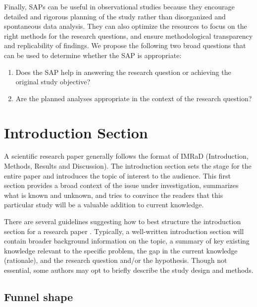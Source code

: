 \documentclass[
]{book}
\providecommand{\tightlist}{%
  \setlength{\itemsep}{0pt}\setlength{\parskip}{0pt}}
\begin{document}
Finally, SAPs can be useful in observational studies because they encourage detailed and rigorous planning of the study rather than disorganized and spontaneous data analysis. They can also optimize the resources to focus on the right methods for the research questions, and ensure methodological transparency and replicability of findings. We propose the following two broad questions that can be used to determine whether the SAP is appropriate:

\begin{enumerate}
\def\labelenumi{\arabic{enumi}.}
\tightlist
\item
  Does the SAP help in answering the research question or achieving the original study objective?
\item
  Are the planned analyses appropriate in the context of the research question?
\end{enumerate}

\hypertarget{introduction-section}{%
\chapter{Introduction Section}\label{introduction-section}}

A scientific research paper generally follows the format of IMRaD (Introduction, Methods, Results and Discussion). The introduction section sets the stage for the entire paper and introduces the topic of interest to the audience. This first section provides a broad context of the issue under investigation, summarizes what is known and unknown, and tries to convince the readers that this particular study will be a valuable addition to current knowledge.

There are several guidelines suggesting how to best structure the introduction section for a research paper \citep[p.84-88]{cals2013effective, bahadoran2018principles, heard2016scientist}. Typically, a well-written introduction section will contain broader background information on the topic, a summary of key existing knowledge relevant to the specific problem, the gap in the current knowledge (rationale), and the research question and/or the hypothesis. Though not essential, some authors may opt to briefly describe the study design and methods.

\hypertarget{funnel-shape}{%
\section{Funnel shape}\label{funnel-shape}}
\end{document}
